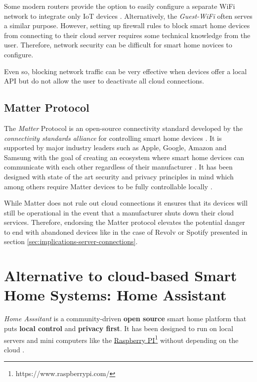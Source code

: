 Some modern routers provide the option to easily configure a separate WiFi network to integrate only IoT devices \cite{BMI-SmartHomeSecurity}. Alternatively, the \textit{Guest-WiFi} often serves a similar purpose. However, setting up firewall rules to block smart home devices from connecting to their cloud server requires some technical knowledge from the user. Therefore, network security can be difficult for smart home novices to configure.

Even so, blocking network traffic can be very effective when devices offer a local API but do not allow the user to deactivate all cloud connections.

\subsection{Matter Protocol}
The \textit{Matter} Protocol is an open-source connectivity standard developed by the \textit{connectivity standards alliance} for controlling smart home devices \cite{Matter-Security&Privacy}. It is supported by major industry leaders such as Apple, Google, Amazon and Samsung with the goal of creating an ecosystem where smart home devices can communicate with each other regardless of their manufacturer \cite{Matter-10288747}. It has been designed with state of the art security and privacy principles in mind which among others require Matter devices to be fully controllable locally \cite{Matter-Security&Privacy}.

While Matter does not rule out cloud connections \cite{Matter-Security&Privacy} it ensures that its devices will still be operational in the event that a manufacturer shuts down their cloud services. Therefore, endorsing the Matter protocol elevates the potential danger to end with abandoned devices like in the case of Revolv or Spotify presented in section \ref{sec:implications-server-connections}.

\newpage


\section{Alternative to cloud-based Smart Home Systems: Home Assistant} \label{sec:Home Assistant}
\textit{Home Asssitant} is a community-driven \textbf{open source} smart home platform that puts \textbf{local control} and \textbf{privacy first}. It has been designed to run on local servers and mini computers like the \href{https://www.raspberrypi.com/}{Raspberry PI}\footnote{https://www.raspberrypi.com/} without depending on the cloud \cite{HomeAssistant_Startpage}.

